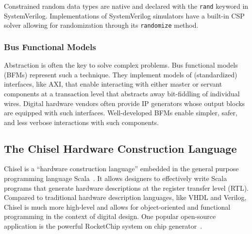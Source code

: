 \documentclass[conference]{IEEEtran}
\begin{document}
Constrained random data types are native and declared with the \texttt{rand} keyword in SystemVerilog. 
Implementations of SystemVerilog simulators have a built-in CSP solver allowing for randomization through its \texttt{randomize} method.

\subsubsection{Bus Functional Models}

Abstraction is often the key to solve complex problems. Bus functional models (BFMs) represent such 
a technique. They implement models of (standardized) interfaces, like AXI, that enable 
interacting with either master or servant components at a transaction level that abstracts away 
bit-fiddling of individual wires. Digital hardware vendors often provide IP generators whose output 
blocks are equipped with such interfaces. Well-developed BFMs enable simpler, safer, and less 
verbose interactions with such components.

\subsection{The Chisel Hardware Construction Language}\label{subsec:chisel}

Chisel is a ``hardware construction language'' embedded in the general purpose programming language Scala~\cite{bachrach2012chisel, chisel:book}.
It allows designers to effectively write Scala programs that generate hardware descriptions at the register transfer level (RTL).
Compared to traditional hardware description languages, like 
VHDL and Verilog, Chisel is much more high-level and allows for object-oriented and functional 
programming in the context of digital design.
One popular open-source application is the powerful RocketChip system on chip generator~\cite{rocketchip}.
\end{document}
